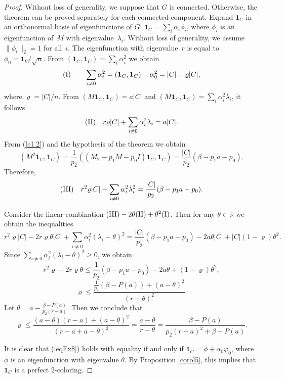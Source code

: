 \documentclass[11pt]{article}
\theoremstyle{definition}
\begin{document}
\begin{proof} Without loss of generality, we suppose that  $G$ is
connected.
Otherwise, the theorem can be proved separately for each connected component.
 Expand ${ {\mathbf{1}}}_{C}$
in an orthonormal basis of eigenfunctions of $G$:
${\mathbf{1}}_{C}=\sum_i\alpha_i\phi_i$, where $\phi_i$ is an
eigenfunction of~$M$ with   eigenvalue~$\lambda_i$. Without loss of
generality, we assume  $\|\phi_i\|_2=1$ for all~$i$. The
eigenfunction with   eigenvalue~$r$ is equal to
$\phi_0=\mathbf{1}_V/\sqrt{n}$.  From $({
{\mathbf{1}}}_{C},{\mathbf{1}}_{C})= \sum_i\alpha^2_i$ we obtain
$$
{\rm (I)} \qquad \sum\limits_{i\neq 0}\alpha^2_i=
({\mathbf{1}}_{C},{ {\mathbf{1}}}_{C})-\alpha^2_0=|C|- \varrho|C|,
$$
 where $\varrho=|C|/n$. From $(M{\mathbf{1}}_{C},{\mathbf{1}}_{C})=
 a|C|$ and $
(M{\mathbf{1}}_{C},{\mathbf{1}}_{C})=\sum_i\alpha^2_i\lambda_i $, it
follows
$$
{\rm (II)} \quad r\varrho|C|+\sum\limits_{i\neq
0}\alpha^2_i\lambda_i= a|C|.$$ From (\ref{e1.2}) and  the hypothesis
of the theorem we obtain
$$(M^2{\mathbf{1}}_{C},{\mathbf{1}}_{C})=
\frac{1}{p_2}((M_2-p_1M-p_0I){\mathbf{1}}_{C},{\mathbf{1}}_{C})=
\frac{|C|}{p_2}(\beta-p_1a-p_0).  $$ Therefore,
$$
{\rm (III)} \quad r^2\varrho|C|+\sum\limits_{i\neq
0}\alpha^2_i\lambda^2_i= \frac{|C|}{p_2}(\beta-p_1a-p_0).
$$


Consider the linear combination
${\rm (III)}-2\theta{\rm
(II)}+\theta^2{\rm (I)}$.  Then for any $\theta \in \mathbb{R}$ we
obtain the  inequalities
$$r^2\varrho|C|-2 r\varrho\theta|C|+\sum\limits_{i\neq
0}\alpha^2_i(\lambda_i-\theta)^2=
\frac{|C|}{p_2}(\beta-p_1a-p_0)-2a\theta|C|+|C|(1-\varrho)\theta^2.$$
Since $\sum\limits_{i\neq
0}\alpha^2_i(\lambda_i-\theta)^2\geq 0$, we obtain
\begin{equation}\label{eqEx8}
r^2\varrho-2 r\varrho\theta\leq
\frac{1}{p_2}(\beta-p_1a-p_0)-2a\theta+(1-\varrho)\theta^2,
\end{equation}
$$\varrho\leq\frac{\frac{1}{p_2}(\beta-P(a))+(a-\theta)^2}{(r-\theta)^2}.$$
Let $\theta=a-\frac{\beta-P(a)}{p_2(r-a)}$. Then we conclude that
$$\varrho\leq\frac{(a-\theta)(r-a)+(a-\theta)^2}{(r-a+a-\theta)^2}=\frac{a-\theta}{r-\theta}=   \frac{\beta-P(a)}{p_2(r-a)^2+\beta-P(a)}.$$

It is clear that (\ref{eqEx8}) holds with equality if and only if
${\mathbf{1}}_{C}=\phi+\alpha_0\varphi_0$, where $\phi$ is an eigenfunction with
eigenvalue $\theta$. By Proposition \ref{corol5}, this implies  that
${\mathbf{1}}_{C}$ is a perfect $2$-coloring. 
\end{proof}
\end{document}
